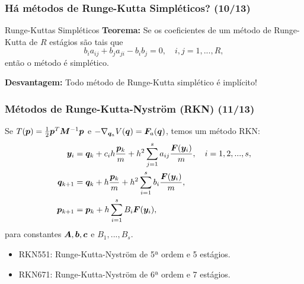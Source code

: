 
\begin{frame}
\justifying
\frametitle{Há métodos de Runge-Kutta Simpléticos? (10/13)}

\begin{block}{Runge-Kuttas Simpléticos \cite[p.192]{hairer}}
    \textbf{Teorema:} Se os coeficientes de um método de Runge-Kutta de $R$ estágios são tais que
    $$
    b_i a_{ij} + b_j a_{ji} - b_i b_j = 0, \quad i, j = 1, ..., R,
    $$
    então o método é simplético.
\end{block}
\begin{alertblock}{}
    \textbf{Desvantagem:} Todo método de Runge-Kutta simplético é implícito!
\end{alertblock}

\end{frame}


\begin{frame}
\justifying
\frametitle{Métodos de Runge-Kutta-Nyström (RKN) (11/13)}

Se $T(\bm p) = \frac{1}{2} \bm p^T \bm M^{-1} \bm p$ e $-\nabla_{\bm q_a} V(\bm q) = \bm F_a(\bm q)$, temos um método RKN:
\begin{align*}
    \bm y_i & = \bm q_k + c_i h \dfrac{\bm p_k}{m} + h^2 \sum_{j=1}^{s} a_{ij} \dfrac{\bm F(\bm y_i)}{m}, \quad i = 1, 2, ..., s, \\
    \bm q_{k+1} &= \bm q_k + h \dfrac{\bm p_k}{m} + h^2 \sum_{i=1}^{s} b_i \dfrac{\bm F(\bm y_i)}{m}, \\
    \bm p_{k+1} &= \bm p_k + h \sum_{i=1}^{s} B_i \bm F(\bm y_i),
\end{align*}
para constantes $\bm A, \bm b, \bm c$ e $B_1, ..., B_s$.

\begin{exampleblock}{\cite{okunbor}}
\begin{itemize}
    \item RKN551: Runge-Kutta-Nyström de 5ª ordem e 5 estágios.
    \item RKN671: Runge-Kutta-Nyström de 6ª ordem e 7 estágios.
\end{itemize}
\end{exampleblock}

\end{frame}



